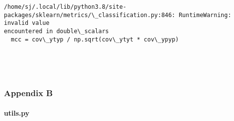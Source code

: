 \documentclass[11pt]{article}
\begin{document}
    \begin{Verbatim}[commandchars=\\\{\}]
/home/sj/.local/lib/python3.8/site-
packages/sklearn/metrics/\_classification.py:846: RuntimeWarning: invalid value
encountered in double\_scalars
  mcc = cov\_ytyp / np.sqrt(cov\_ytyt * cov\_ypyp)
    \end{Verbatim}

    \begin{center}
    \end{center}
    { \hspace*{\fill} \\}
    
    \begin{center}
    \end{center}
    { \hspace*{\fill} \\}
    
    \hypertarget{appendix-b}{%
\subsubsection{Appendix B}\label{appendix-b}}

\hypertarget{utils.py}{%
\paragraph{utils.py}\label{utils.py}}
\end{document}
